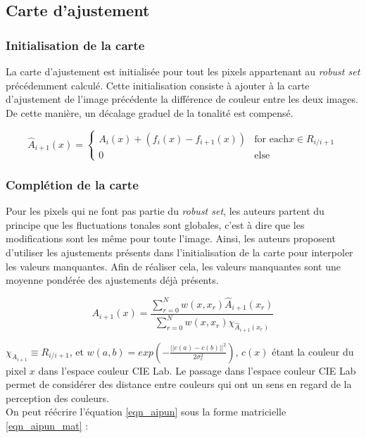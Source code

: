 \subsection{Carte d'ajustement}
\subsubsection*{Initialisation de la carte}
La carte d'ajustement est initialisée pour tout les pixels appartenant au \textit{robust set} précédemment calculé. Cette initialisation consiste à ajouter à la carte d'ajustement de l'image précédente la différence de couleur entre les deux images. De cette manière, un décalage graduel de la tonalité est compensé.

\begin{equation}
\hat{A}_{i+1}(x) = 
\begin{cases}
A_{i}(x) + (f_{i}(x) - f_{i+1}(x)) & \text{for each} x \in R_{i/i+1}\\
0 & \text{else}
\end{cases}
\end{equation}

\subsubsection*{Complétion de la carte}

Pour les pixels qui ne font pas partie du \textit{robust set}, les auteurs partent du principe que les fluctuations tonales sont globales, c'est à dire que les modifications sont les même pour toute l'image.
Ainsi, les auteurs proposent d'utiliser les ajustements présents dans l'initialisation de la carte pour interpoler les valeurs manquantes. Afin de réaliser cela, les valeurs manquantes sont une moyenne pondérée des ajustements déjà présents.

\begin{equation}
A_{i+1}(x) = \frac{\sum_{r=0}^{N}{w(x,x_{r})\hat{A}_{i+1}(x_{r})}}{\sum_{r=0}^{N}{w(x,x_{r})\chi_{\hat{A}_{i+1}(x_{r})}}}
\label{eqn_aipun}
\end{equation}


$\chi_{A_{i+1}} \equiv R_{i/i+1}$, et $w(a,b) = exp(-\frac{||c(a)-c(b)||^2}{2\sigma_{c}^{2}})$, $c(x)$ étant la couleur du pixel $x$ dans l'espace couleur CIE Lab. Le passage dans l'espace couleur CIE Lab permet de considérer des distance entre couleurs qui ont un sens en regard de la perception des couleurs.\\

On peut réécrire l'équation \ref{eqn_aipun} sous la forme matricielle \ref{eqn_aipun_mat} :

